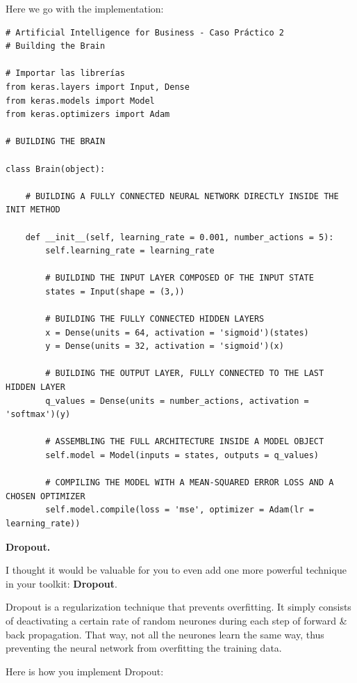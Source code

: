 \documentclass[]{book}
\begin{document}
Here we go with the implementation:

\begin{lstlisting}
# Artificial Intelligence for Business - Caso Práctico 2
# Building the Brain

# Importar las librerías
from keras.layers import Input, Dense
from keras.models import Model
from keras.optimizers import Adam

# BUILDING THE BRAIN

class Brain(object):
    
    # BUILDING A FULLY CONNECTED NEURAL NETWORK DIRECTLY INSIDE THE INIT METHOD
    
    def __init__(self, learning_rate = 0.001, number_actions = 5):
        self.learning_rate = learning_rate
        
        # BUILDIND THE INPUT LAYER COMPOSED OF THE INPUT STATE
        states = Input(shape = (3,))
        
        # BUILDING THE FULLY CONNECTED HIDDEN LAYERS
        x = Dense(units = 64, activation = 'sigmoid')(states)
        y = Dense(units = 32, activation = 'sigmoid')(x)
        
        # BUILDING THE OUTPUT LAYER, FULLY CONNECTED TO THE LAST HIDDEN LAYER
        q_values = Dense(units = number_actions, activation = 'softmax')(y)
        
        # ASSEMBLING THE FULL ARCHITECTURE INSIDE A MODEL OBJECT
        self.model = Model(inputs = states, outputs = q_values)
        
        # COMPILING THE MODEL WITH A MEAN-SQUARED ERROR LOSS AND A CHOSEN OPTIMIZER
        self.model.compile(loss = 'mse', optimizer = Adam(lr = learning_rate))
\end{lstlisting}

\textbf{Dropout.}

I thought it would be valuable for you to even add one more powerful technique in your toolkit: \textbf{Dropout}.

Dropout is a regularization technique that prevents overfitting. It simply consists of deactivating a certain rate of random neurones during each step of forward \& back propagation. That way, not all the neurones learn the same way, thus preventing the neural network from overfitting the training data.

Here is how you implement Dropout:
\end{document}
